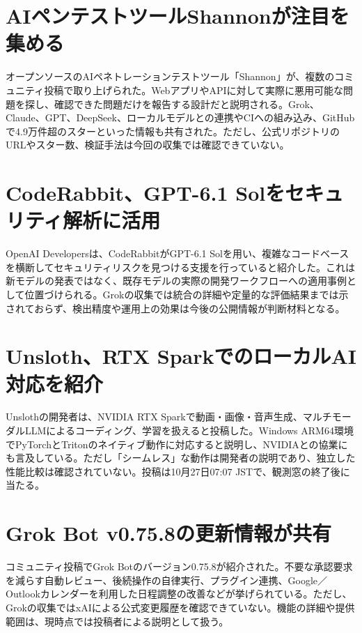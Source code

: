 \section{AIペンテストツールShannonが注目を集める}
オープンソースのAIペネトレーションテストツール「Shannon」が、複数のコミュニティ投稿で取り上げられた。WebアプリやAPIに対して実際に悪用可能な問題を探し、確認できた問題だけを報告する設計だと説明される。Grok、Claude、GPT、DeepSeek、ローカルモデルとの連携やCIへの組み込み、GitHubで4.9万件超のスターといった情報も共有された。ただし、公式リポジトリのURLやスター数、検証手法は今回の収集では確認できていない。

\section{CodeRabbit、GPT-6.1 Solをセキュリティ解析に活用}
OpenAI Developersは、CodeRabbitがGPT-6.1 Solを用い、複雑なコードベースを横断してセキュリティリスクを見つける支援を行っていると紹介した。これは新モデルの発表ではなく、既存モデルの実際の開発ワークフローへの適用事例として位置づけられる。Grokの収集では統合の詳細や定量的な評価結果までは示されておらず、検出精度や運用上の効果は今後の公開情報が判断材料となる。

\section{Unsloth、RTX SparkでのローカルAI対応を紹介}
Unslothの開発者は、NVIDIA RTX Sparkで動画・画像・音声生成、マルチモーダルLLMによるコーディング、学習を扱えると投稿した。Windows ARM64環境でPyTorchとTritonのネイティブ動作に対応すると説明し、NVIDIAとの協業にも言及している。ただし「シームレス」な動作は開発者の説明であり、独立した性能比較は確認されていない。投稿は10月27日07:07 JSTで、観測窓の終了後に当たる。

\section{Grok Bot v0.75.8の更新情報が共有}
コミュニティ投稿でGrok Botのバージョン0.75.8が紹介された。不要な承認要求を減らす自動レビュー、後続操作の自律実行、プラグイン連携、Google／Outlookカレンダーを利用した日程調整の改善などが挙げられている。ただし、Grokの収集ではxAIによる公式変更履歴を確認できていない。機能の詳細や提供範囲は、現時点では投稿者による説明として扱う。
